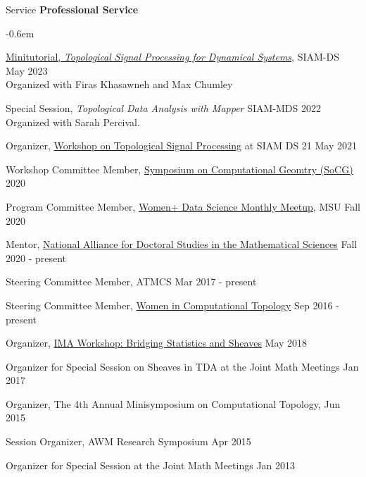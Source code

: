 \documentclass{resume} %
\begin{document}
\begin{rSection}{Service}
\textbf{Professional Service}
\begin{list}{}{\leftmargin=1em}
   \itemsep -0.6em \vspace{-0.5em} %
   \item \href{https://github.com/TeaspoonTDA/2023-SIAM-DS-TDA-Minitutorial}{Minitutorial, \textit{Topological Signal Processing for Dynamical Systems}}, SIAM-DS \hfill May 2023\\
   \phantom{XXX} Organized with Firas Khasawneh and Max Chumley
   \item Special Session, \textit{Topological Data Analysis with Mapper} \hfill SIAM-MDS 2022 \\
   \phantom{XXX} Organized with Sarah Percival. 
\item Organizer, \href{https://meetings.siam.org/sess/dsp_programsess.cfm?SESSIONCODE=71292}
{Workshop on Topological Signal Processing} at SIAM DS 21 \hfill May 2021
\item
Workshop Committee Member, \href{https://socg20.inf.ethz.ch/}{Symposium on Computational Geomtry (SoCG)} \hfill 2020
\item
Program Committee Member, \href{https://women-plus-datascience.github.io/}{Women+ Data Science Monthly Meetup}, MSU \hfill Fall 2020 %
\item Mentor, \href{https://mathalliance.org/mentor/liz-munch/}{National Alliance for Doctoral Studies in the Mathematical Sciences} \hfill Fall 2020 - present
\item
Steering Committee Member, ATMCS \hfill Mar 2017 - present
\item
Steering Committee Member, \href{https://awmadvance.org/research-networks/wincomptop-women-in-computational-topology/}{Women in Computational Topology} \hfill Sep 2016 - present
\item
Organizer, \href{https://www.ima.umn.edu/2017-2018/SW5.21-25.18}{IMA Workshop: Bridging Statistics and Sheaves} \hfill May 2018
\item
{Organizer for Special Session on Sheaves in TDA at the Joint Math Meetings} \hfill Jan 2017
\item
{Organizer, The 4th Annual Minisymposium on Computational Topology,  } \hfill Jun 2015\\
\phantom{MMM}{CG Week at the Symposium on Computational Geometry}
\item
{Session Organizer, AWM Research Symposium} \hfill Apr 2015
\item
{Organizer for Special Session at the Joint Math Meetings} \hfill Jan 2013
\end{list}



\end{rSection}
\end{document}
